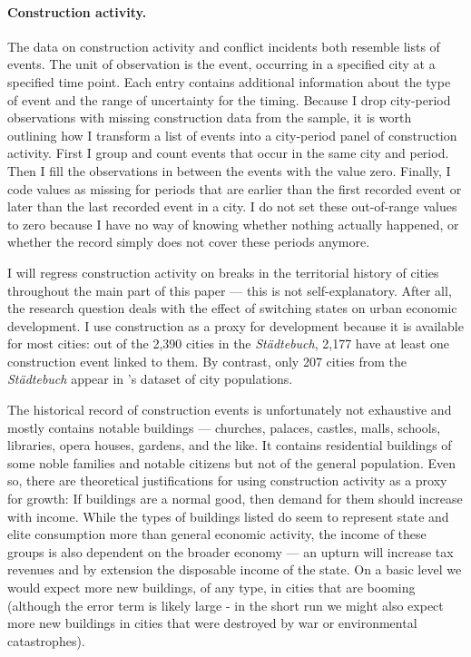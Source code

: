 \documentclass[11pt, a4paper]{article}
\begin{document}
\paragraph{Construction activity.}

The data on construction activity \citep{pt5} and conflict incidents \citep{pt6} both resemble lists of events. The unit of observation is the event, occurring in a specified city at a specified time point. Each entry contains additional information about the type of event and the range of uncertainty for the timing. Because I drop city-period observations with missing construction data from the sample, it is worth outlining how I transform a list of events into a city-period panel of construction activity. First I group and count events that occur in the same city and period. Then I fill the observations in between the events with the value zero. Finally, I code values as missing for periods that are earlier than the first recorded event or later than the last recorded event in a city. I do not set these out-of-range values to zero because I have no way of knowing whether nothing actually happened, or whether the record simply does not cover these periods anymore.

I will regress construction activity on breaks in the territorial history of cities throughout the main part of this paper --- this is not self-explanatory. After all, the research question deals with the effect of switching states on urban economic development. I use construction as a proxy for development because it is available for most cities: out of the 2,390 cities in the \textit{Städtebuch}, 2,177 have at least one construction event linked to them. By contrast, only 207 cities from the \textit{Städtebuch} appear in \cite{bairoch1988}'s dataset of city populations.

The historical record of construction events is unfortunately not exhaustive and mostly contains notable buildings --- churches, palaces, castles, malls, schools, libraries, opera houses, gardens, and the like. It contains residential buildings of some noble families and notable citizens but not of the general population. Even so, there are theoretical justifications for using construction activity as a proxy for growth: If buildings are a normal good, then demand for them should increase with income. While the types of buildings listed do seem to represent state and elite consumption more than general economic activity, the income of these groups is also dependent on the broader economy --- an upturn will increase tax revenues and by extension the disposable income of the state. On a basic level we would expect more new buildings, of any type, in cities that are booming (although the error term is likely large - in the short run we might also expect more new buildings in cities that were destroyed by war or environmental catastrophes).
\end{document}
